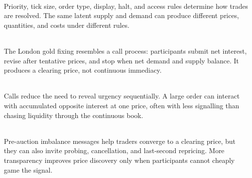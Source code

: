 \documentclass[a4paper,oneside,openany]{book}
\begin{document}
\begin{marketrule} \\
Priority, tick size, order type, display, halt, and access rules determine how trades are resolved. The same latent supply and demand can produce different prices, quantities, and costs under different rules.
\end{marketrule}

\begin{casestudy} \\
The London gold fixing resembles a call process: participants submit net interest, revise after tentative prices, and stop when net demand and supply balance. It produces a clearing price, not continuous immediacy.
\end{casestudy}

\begin{practitionernote} \\
Calls reduce the need to reveal urgency sequentially. A large order can interact with accumulated opposite interest at one price, often with less signalling than chasing liquidity through the continuous book.
\end{practitionernote}

\begin{caveat} \\
Pre-auction imbalance messages help traders converge to a clearing price, but they can also invite probing, cancellation, and last-second repricing. More transparency improves price discovery only when participants cannot cheaply game the signal.
\end{caveat}
\end{document}
